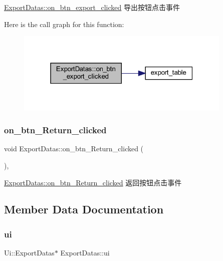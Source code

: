 \mbox{\hyperlink{class_export_datas_a937c315ff3df44fa7693741cc9f046a4}{Export\+Datas\+::on\+\_\+btn\+\_\+export\+\_\+clicked}} 导出按钮点击事件 

Here is the call graph for this function\+:
\nopagebreak
\begin{figure}[H]
\begin{center}
\leavevmode
\includegraphics[width=292pt]{class_export_datas_a937c315ff3df44fa7693741cc9f046a4_cgraph}
\end{center}
\end{figure}
\mbox{\label{class_export_datas_aabc1ba322fdca1fd2eb40e123eb68f92}} 
\subsubsection{\texorpdfstring{on\_btn\_Return\_clicked}{on\_btn\_Return\_clicked}}
{\footnotesize\ttfamily void Export\+Datas\+::on\+\_\+btn\+\_\+\+Return\+\_\+clicked (\begin{DoxyParamCaption}{ }\end{DoxyParamCaption})\hspace{0.3cm}{\ttfamily [private]}, {\ttfamily [slot]}}



\mbox{\hyperlink{class_export_datas_aabc1ba322fdca1fd2eb40e123eb68f92}{Export\+Datas\+::on\+\_\+btn\+\_\+\+Return\+\_\+clicked}} 返回按钮点击事件 



\subsection{Member Data Documentation}
\mbox{\label{class_export_datas_afc65ebd628b8160037d1025c03f261ef}} 
\subsubsection{\texorpdfstring{ui}{ui}}
{\footnotesize\ttfamily Ui\+::\+Export\+Datas$\ast$ Export\+Datas\+::ui\hspace{0.3cm}{\ttfamily [private]}}



